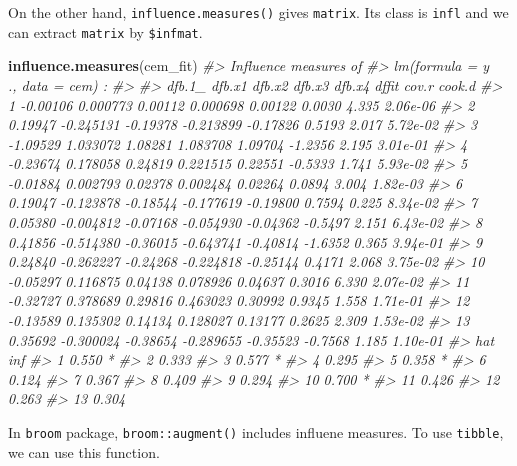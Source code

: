 \documentclass[]{book}
\newenvironment{Shaded}{\begin{snugshade}}{\end{snugshade}}
\newcommand{\CommentTok}[1]{\textcolor[rgb]{0.56,0.35,0.01}{\textit{#1}}}
\newcommand{\KeywordTok}[1]{\textcolor[rgb]{0.13,0.29,0.53}{\textbf{#1}}}
\newcommand{\NormalTok}[1]{#1}
\theoremstyle{definition}
\theoremstyle{definition}
\theoremstyle{definition}
\theoremstyle{remark}
\begin{document}
On the other hand, \texttt{influence.measures()} gives \texttt{matrix}. Its class is \texttt{infl} and we can extract \texttt{matrix} by \texttt{\$infmat}.

\begin{Shaded}
\begin{Highlighting}[]
\KeywordTok{influence.measures}\NormalTok{(cem_fit)}
\CommentTok{#> Influence measures of}
\CommentTok{#>   lm(formula = y ~ ., data = cem) :}
\CommentTok{#> }
\CommentTok{#>      dfb.1_    dfb.x1   dfb.x2    dfb.x3   dfb.x4   dffit cov.r   cook.d}
\CommentTok{#> 1  -0.00106  0.000773  0.00112  0.000698  0.00122  0.0030 4.335 2.06e-06}
\CommentTok{#> 2   0.19947 -0.245131 -0.19378 -0.213899 -0.17826  0.5193 2.017 5.72e-02}
\CommentTok{#> 3  -1.09529  1.033072  1.08281  1.083708  1.09704 -1.2356 2.195 3.01e-01}
\CommentTok{#> 4  -0.23674  0.178058  0.24819  0.221515  0.22551 -0.5333 1.741 5.93e-02}
\CommentTok{#> 5  -0.01884  0.002793  0.02378  0.002484  0.02264  0.0894 3.004 1.82e-03}
\CommentTok{#> 6   0.19047 -0.123878 -0.18544 -0.177619 -0.19800  0.7594 0.225 8.34e-02}
\CommentTok{#> 7   0.05380 -0.004812 -0.07168 -0.054930 -0.04362 -0.5497 2.151 6.43e-02}
\CommentTok{#> 8   0.41856 -0.514380 -0.36015 -0.643741 -0.40814 -1.6352 0.365 3.94e-01}
\CommentTok{#> 9   0.24840 -0.262227 -0.24268 -0.224818 -0.25144  0.4171 2.068 3.75e-02}
\CommentTok{#> 10 -0.05297  0.116875  0.04138  0.078926  0.04637  0.3016 6.330 2.07e-02}
\CommentTok{#> 11 -0.32727  0.378689  0.29816  0.463023  0.30992  0.9345 1.558 1.71e-01}
\CommentTok{#> 12 -0.13589  0.135302  0.14134  0.128027  0.13177  0.2625 2.309 1.53e-02}
\CommentTok{#> 13  0.35692 -0.300024 -0.38654 -0.289655 -0.35523 -0.7568 1.185 1.10e-01}
\CommentTok{#>      hat inf}
\CommentTok{#> 1  0.550   *}
\CommentTok{#> 2  0.333    }
\CommentTok{#> 3  0.577   *}
\CommentTok{#> 4  0.295    }
\CommentTok{#> 5  0.358   *}
\CommentTok{#> 6  0.124    }
\CommentTok{#> 7  0.367    }
\CommentTok{#> 8  0.409    }
\CommentTok{#> 9  0.294    }
\CommentTok{#> 10 0.700   *}
\CommentTok{#> 11 0.426    }
\CommentTok{#> 12 0.263    }
\CommentTok{#> 13 0.304}
\end{Highlighting}
\end{Shaded}

In \texttt{broom} package, \texttt{broom::augment()} includes influene measures. To use \texttt{tibble}, we can use this function.
\end{document}
